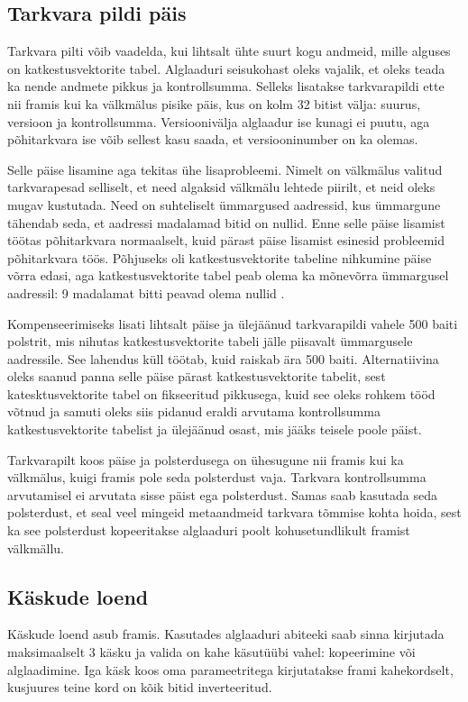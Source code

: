 \documentclass[12pt,a4paper]{article}
\begin{document}
\subsection{Tarkvara pildi päis}
\label{sec:impl:header}
Tarkvara pilti võib vaadelda, kui lihtsalt ühte suurt kogu andmeid, mille
alguses on katkestusvektorite tabel. Alglaaduri seisukohast oleks vajalik, et
oleks teada ka nende andmete pikkus ja kontrollsumma. Selleks lisatakse
tarkvarapildi ette nii \gls{fram}is kui ka välkmälus pisike päis, kus on kolm 32
bitist välja: suurus, versioon ja kontrollsumma. Versioonivälja alglaadur ise
kunagi ei puutu, aga põhitarkvara ise võib sellest kasu saada, et
versiooninumber on ka olemas.

Selle päise lisamine aga tekitas ühe lisaprobleemi. Nimelt on välkmälus valitud
tarkvarapesad selliselt, et need algaksid välkmälu lehtede piirilt, et neid
oleks mugav kustutada. Need on suhteliselt ümmargused aadressid, kus ümmargune
tähendab seda, et aadressi madalamad bitid on nullid. Enne selle päise lisamist
töötas põhitarkvara normaalselt, kuid pärast päise lisamist esinesid probleemid
põhitarkvara töös. Põhjuseks oli katkestusvektorite tabeline nihkumine päise
võrra edasi, aga katkestusvektorite tabel peab olema ka mõnevõrra ümmargusel
aadressil: 9 madalamat bitti peavad olema nullid \cite{CM3pm}.

Kompenseerimiseks lisati lihtsalt päise ja ülejäänud tarkvarapildi vahele 500
baiti polstrit, mis nihutas katkestusvektorite tabeli jälle piisavalt
ümmargusele aadressile. See lahendus küll töötab, kuid raiskab ära 500 baiti.
Alternatiivina oleks saanud panna selle päise pärast katkestusvektorite tabelit,
sest katesktusvektorite tabel on fikseeritud pikkusega, kuid see oleks rohkem
tööd võtnud ja samuti oleks siis pidanud eraldi arvutama kontrollsumma
katkestusvektorite tabelist ja ülejäänud osast, mis jääks teisele poole päist.

Tarkvarapilt koos päise ja polsterdusega on ühesugune nii \gls{fram}is kui ka
välkmälus, kuigi \gls{fram}is pole seda polsterdust vaja. Tarkvara kontrollsumma
arvutamisel ei arvutata sisse päist ega polsterdust. Samas saab kasutada seda
polsterdust, et seal veel mingeid metaandmeid tarkvara tõmmise kohta hoida, sest ka
see polsterdust kopeeritakse alglaaduri poolt kohusetundlikult \gls{fram}ist
välkmällu.

\subsection{Käskude loend}
Käskude loend asub \gls{fram}is. Kasutades alglaaduri abiteeki saab sinna kirjutada
maksimaalselt 3 käsku ja valida on kahe käsutüübi vahel: kopeerimine või
alglaadimine. Iga käsk koos oma parameetritega kirjutatakse \gls{fram}i kahekordselt,
kusjuures teine kord on kõik bitid inverteeritud. 
\end{document}
